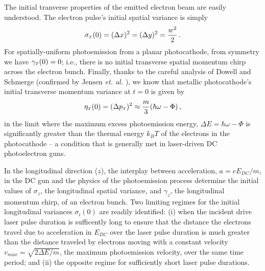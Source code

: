 The initial tranverse properties of the emitted electron beam are easily understood.
The electron pulse's initial spatial variance is simply
\begin{equation}
\sigma_{{\scriptscriptstyle T} } ( 0 ) = ( \Delta x )^{2} = ( \Delta y)^{2} = \frac{ w^{2} }{ 2 } \, \text{.}
\end{equation}
For spatially-uniform photoemission from a planar photocathode, from symmetry we have $ \gamma_{{\scriptscriptstyle T}} ( 0 ) = 0 $; i.e., there is no initial transverse spatial momentum chirp across the electron bunch.
Finally, thanks to the careful analysis of Dowell and Schmerge \cite{dowell_quantum_2009} (confirmed by Jensen \textit{et. al.} \cite{jensen_emittance_2010}), we know that metallic photocathode's initial transverse momentum variance at $ t = 0 $ is given by
\begin{equation} \label{eq:jensen_eta}
  \eta_{ {\scriptscriptstyle T} } ( 0 )  = (\Delta p_{{\scriptscriptstyle T}})^2 \approx \frac{ m }{ 3 } ( \hbar \omega - \Phi ) \, \text{,}
\end{equation}
in the limit where the maximum excess photoemission energy, $ \Delta E = \hbar \omega - \Phi $ is significantly greater than the thermal energy $ k_{B} T $ of the electrons in the photocathode -- a condition that is generally met in laser-driven DC photoelectron guns.

In the longitudinal direction ($z$), the interplay between acceleration, $ a = e E_{DC}/m $, in the DC gun and the physics of the photoemission process determine the initial values of $\sigma_z$, the longitudinal spatial variance, and $\gamma_z$, the longitudinal momentum chirp, of an electron bunch.
Two limiting regimes for the initial longitudinal variances $ \sigma_{i} ( 0 ) $ are readily identified: (i) when the incident drive laser pulse duration is sufficently long to ensure that the distance the electrons travel due to acceleration in $ E_{DC} $ over the laser pulse duration is much greater than the distance traveled by electrons moving with a constant velocity $ v_{max} = \sqrt{ 2 \Delta E / m } $, the maximum photoemission velocity, over the same time period; and (ii) the opposite regime for sufficiently short laser pulse durations.

